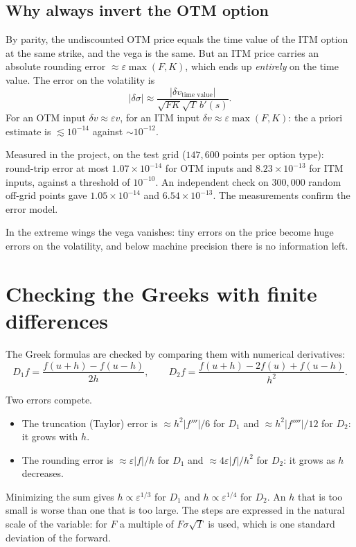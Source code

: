 \subsection{Why always invert the OTM option}
By parity, the undiscounted OTM price equals the time value of the ITM option at the same strike, and the vega is the
same. But an ITM price carries an absolute rounding error $\approx\varepsilon\max(F,K)$, which ends up \emph{entirely}
on the time value. The error on the volatility is
\begin{equation}\label{eq:errore-iv}
|\delta\sigma|\approx\frac{|\delta v_{\text{time value}}|}{\sqrt{FK}\sqrt T\,b'(s)} .
\end{equation}
For an OTM input $\delta v\approx\varepsilon v$, for an ITM input $\delta v\approx\varepsilon\max(F,K)$: the a priori
estimate is $\lesssim10^{-14}$ against $\sim10^{-12}$.

Measured in the project, on the test grid ($147{,}600$ points per option type): round-trip error at most
${1.07\times10^{-14}}$ for OTM inputs and ${8.23\times10^{-13}}$ for ITM inputs, against a threshold of $10^{-10}$.
An independent check on $300{,}000$ random off-grid points gave ${1.05\times10^{-14}}$ and ${6.54\times10^{-13}}$. The
measurements confirm the error model.

In the extreme wings the vega vanishes: tiny errors on the price become huge errors on the volatility, and below
machine precision there is no information left.

\section{Checking the Greeks with finite differences}
The Greek formulas are checked by comparing them with numerical derivatives:
\begin{equation}\label{eq:diff-finite}
D_1f=\frac{f(u+h)-f(u-h)}{2h},\qquad D_2f=\frac{f(u+h)-2f(u)+f(u-h)}{h^2}.
\end{equation}

\begin{perche}[title={How to choose the step $h$}]
Two errors compete.
\begin{itemize}
\item The truncation (Taylor) error is $\approx h^2|f'''|/6$ for $D_1$ and $\approx h^2|f''''|/12$ for $D_2$: it grows
with $h$.
\item The rounding error is $\approx\varepsilon|f|/h$ for $D_1$ and $\approx4\varepsilon|f|/h^2$ for $D_2$: it grows
as $h$ decreases.
\end{itemize}
Minimizing the sum gives $h\propto\varepsilon^{1/3}$ for $D_1$ and $h\propto\varepsilon^{1/4}$ for $D_2$. An $h$ that
is too small is worse than one that is too large. The steps are expressed in the natural scale of the variable: for
$F$ a multiple of $F\sigma\sqrt T$ is used, which is one standard deviation of the forward.
\end{perche}

